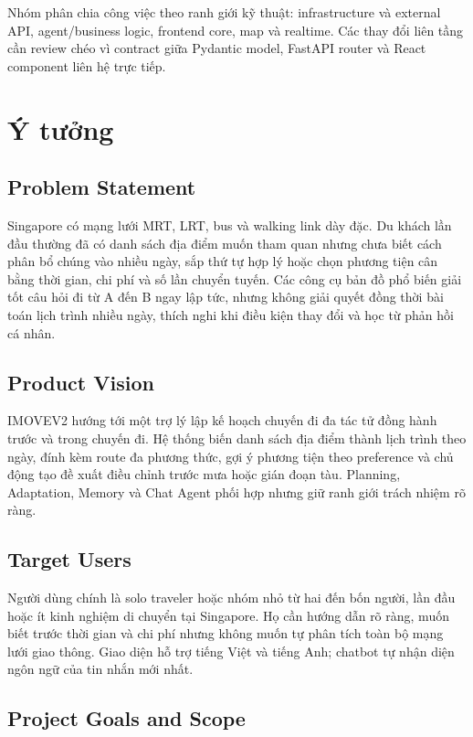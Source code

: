 \documentclass[12pt,a4paper]{article}
\begin{document}
Nhóm phân chia công việc theo ranh giới kỹ thuật: infrastructure và external API, agent/business logic, frontend core, map và realtime. Các thay đổi liên tầng cần review chéo vì contract giữa Pydantic model, FastAPI router và React component liên hệ trực tiếp.

\section{Ý tưởng}

\subsection{Problem Statement}


Singapore có mạng lưới MRT, LRT, bus và walking link dày đặc. Du khách lần đầu thường đã có danh sách địa điểm muốn tham quan nhưng chưa biết cách phân bổ chúng vào nhiều ngày, sắp thứ tự hợp lý hoặc chọn phương tiện cân bằng thời gian, chi phí và số lần chuyển tuyến. Các công cụ bản đồ phổ biến giải tốt câu hỏi đi từ A đến B ngay lập tức, nhưng không giải quyết đồng thời bài toán lịch trình nhiều ngày, thích nghi khi điều kiện thay đổi và học từ phản hồi cá nhân.

\subsection{Product Vision}

IMOVEV2 hướng tới một trợ lý lập kế hoạch chuyến đi đa tác tử đồng hành trước và trong chuyến đi. Hệ thống biến danh sách địa điểm thành lịch trình theo ngày, đính kèm route đa phương thức, gợi ý phương tiện theo preference và chủ động tạo đề xuất điều chỉnh trước mưa hoặc gián đoạn tàu. Planning, Adaptation, Memory và Chat Agent phối hợp nhưng giữ ranh giới trách nhiệm rõ ràng.

\subsection{Target Users}

Người dùng chính là solo traveler hoặc nhóm nhỏ từ hai đến bốn người, lần đầu hoặc ít kinh nghiệm di chuyển tại Singapore. Họ cần hướng dẫn rõ ràng, muốn biết trước thời gian và chi phí nhưng không muốn tự phân tích toàn bộ mạng lưới giao thông. Giao diện hỗ trợ tiếng Việt và tiếng Anh; chatbot tự nhận diện ngôn ngữ của tin nhắn mới nhất.

\subsection{Project Goals and Scope}
\end{document}

